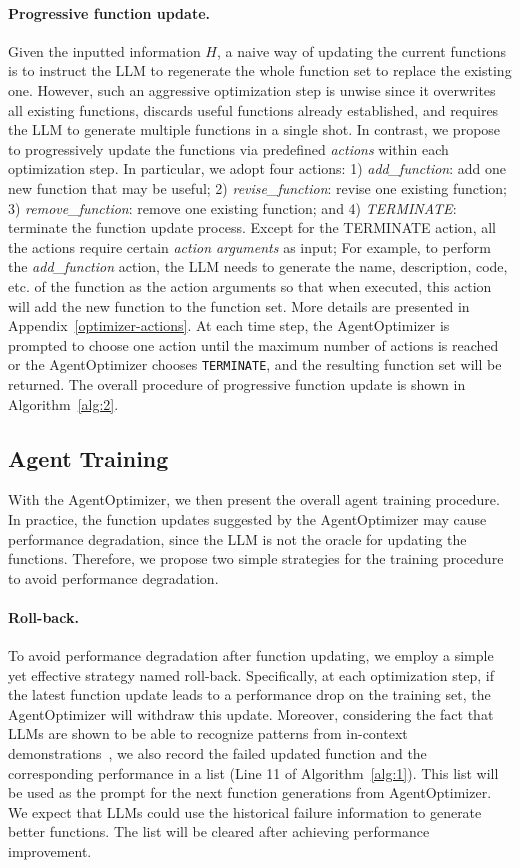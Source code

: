 \documentclass{article}
\theoremstyle{plain}
\theoremstyle{definition}
\theoremstyle{remark}
\begin{document}
\paragraph{Progressive function update.}
Given the inputted information $H$, a naive way of updating the current functions is to instruct the LLM to regenerate the whole function set to replace the existing one.
However, such an aggressive optimization step is unwise since it overwrites all existing functions, discards useful functions already established, and requires the LLM to generate multiple functions in a single shot.
In contrast, we propose to progressively update the functions via predefined \emph{actions} within each optimization step. 
In particular, we adopt four actions:
1) \emph{add\_function}: add one new function that may be useful; 2) \emph{revise\_function}: revise one existing function; 3) \emph{remove\_function}: remove one existing function; and 4) \emph{TERMINATE}: terminate the function update process.
Except for the TERMINATE action, all the actions 
require certain \emph{action arguments} as input; For example, to perform the \emph{add\_function} action, the LLM needs to generate the name, description, code, etc. of the function as the action arguments so that when executed, this action will add the new function to the function set. More details are presented in Appendix~\ref{optimizer-actions}.
At each time step, the AgentOptimizer is prompted to choose one action until the maximum number of actions is reached or the AgentOptimizer chooses \texttt{TERMINATE}, and the resulting function set will be returned.
The overall procedure of progressive function update is shown in Algorithm~\ref{alg:2}. 
\subsection{Agent Training}

With the AgentOptimizer, we then present the overall agent training procedure.
In practice, the function updates suggested by the AgentOptimizer may cause performance degradation, since the LLM is not the oracle for updating the functions. 
Therefore, we propose two simple strategies for the training procedure to avoid performance degradation.

\paragraph{Roll-back.}


To avoid performance degradation after function updating, we employ a simple yet effective strategy named roll-back. Specifically, at each optimization step, if the latest function update leads to a performance drop on the training set, the AgentOptimizer will withdraw this update. Moreover, considering the fact that LLMs are shown to be able to recognize patterns from in-context demonstrations~\cite{wei2022chain}, we also record the failed updated function and the corresponding performance in a list (Line 11 of Algorithm~\ref{alg:1}).  This list will be used as the prompt for the next function generations from AgentOptimizer. We expect that LLMs could use the historical failure information to generate better functions. The list will be cleared after achieving performance improvement.
\end{document}
